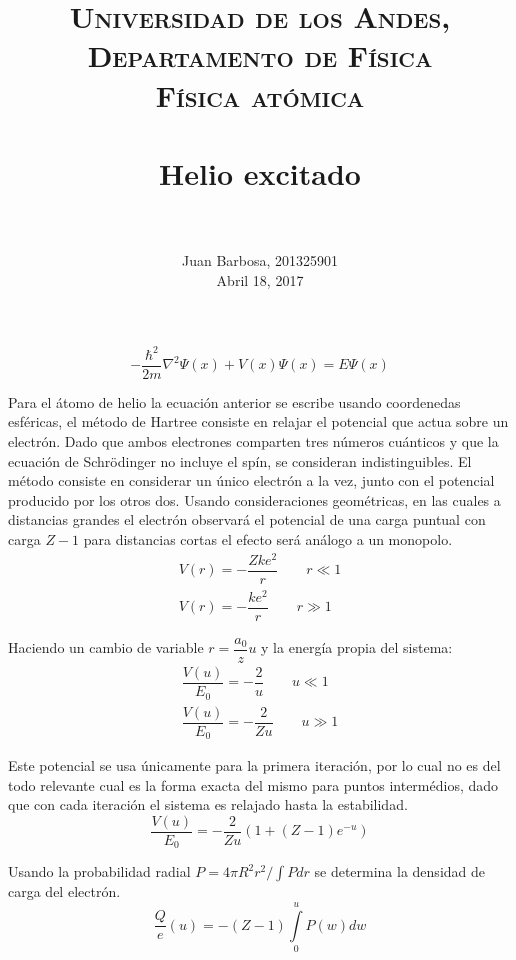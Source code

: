 \documentclass[paper=letter, fontsize=11pt]{scrartcl}
\title{
        \usefont{OT1}{bch}{b}{n}
        \normalfont \normalsize \textsc{Universidad de los Andes, Departamento de F\'isica \\
        F\'isica at\'omica} \\ [25pt]
        \horrule{0.5pt} \\[0.4cm]
        \huge Helio excitado \\
        \horrule{2pt} \\[0.5cm]
}
\author{
        \normalfont                                 \normalsize
        Juan Barbosa, 201325901\\[-3pt]      \normalsize
        Abril 18, 2017
}
\date{}
\begin{document}
\maketitle

\[
\boxed{-\dfrac{\hbar^2}{2m}\nabla^2\Psi(x) + V(x)\Psi(x) = E\Psi(x)}
\]

Para el \'atomo de helio la ecuaci\'on anterior se escribe usando coordenedas esf\'ericas, el m\'etodo de Hartree consiste en relajar el potencial que actua sobre un electr\'on. Dado que ambos electrones comparten tres n\'umeros cu\'anticos y que la ecuaci\'on de Schr\"odinger no incluye el sp\'in, se consideran indistinguibles. El m\'etodo consiste en considerar un \'unico electr\'on a la vez, junto con el potencial producido por los otros dos. Usando consideraciones geom\'etricas, en las cuales a distancias grandes el electr\'on observar\'a el potencial de una carga puntual con carga $Z-1$ para distancias cortas el efecto ser\'a an\'alogo a un monopolo. 
\begin{equation}
	\begin{matrix}
		V(r) = -\dfrac{Zke^2}{r} \qquad r \ll 1 \\
		V(r) = -\dfrac{ke^2}{r} \qquad r \gg 1
	\end{matrix}
\end{equation}

Haciendo un cambio de variable $r=\dfrac{a_0}{z}u$ y la energ\'ia propia del sistema:
\begin{equation}
	\begin{matrix}
		\dfrac{V(u)}{E_0} = -\dfrac{2}{u} \qquad u \ll 1 \\
		\dfrac{V(u)}{E_0} = -\dfrac{2}{Zu} \qquad u \gg 1
	\end{matrix}
\end{equation}

Este potencial se usa \'unicamente para la primera iteraci\'on, por lo cual no es del todo relevante cual es la forma exacta del mismo para puntos interm\'edios, dado que con cada iteraci\'on el sistema es relajado hasta la estabilidad.
\begin{equation}
	\dfrac{V(u)}{E_0} = -\dfrac{2}{Zu}\left(1+(Z-1)e^{-u}\right)
\end{equation}

Usando la probabilidad radial $P=4\pi R^2r^2/\int Pdr$ se determina la densidad de carga del electr\'on.
\begin{equation}
	\dfrac{Q}{e}(u) = -(Z-1)\int\limits_{0}^{u}P(w)dw
\end{equation}
\end{document}
